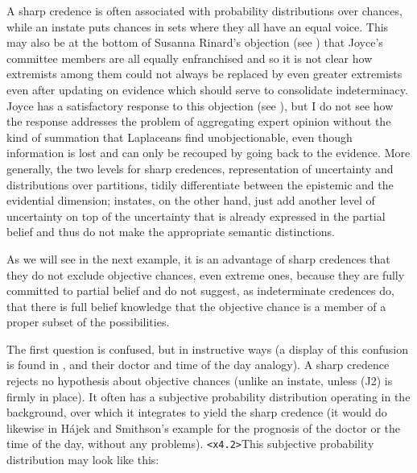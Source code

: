 \documentclass[11pt]{article}
\begin{document}
A sharp credence is often associated with probability distributions
over chances, while an instate puts chances in sets where they all
have an equal voice. This may also be at the bottom of Susanna
Rinard's objection (see ) that Joyce's
committee members are all equally enfranchised and so it is not clear
how extremists among them could not always be replaced by even greater
extremists even after updating on evidence which should serve to
consolidate indeterminacy. Joyce has a satisfactory response to this
objection (see ), but I do not see how the
response addresses the problem of aggregating expert opinion without
the kind of summation that Laplaceans find unobjectionable, even
though information is lost and can only be recouped by going back to
the evidence. More generally, the two levels for sharp credences,
representation of uncertainty and distributions over partitions,
tidily differentiate between the epistemic and the evidential
dimension; instates, on the other hand, just add another level of
uncertainty on top of the uncertainty that is already expressed in the
partial belief and thus do not make the appropriate semantic
distinctions.

As we will see in the next example, it is an advantage of sharp
credences that they do not exclude objective chances, even extreme
ones, because they are fully committed to partial belief and do not
suggest, as indeterminate credences do, that there is full belief
knowledge that the objective chance is a member of a proper subset of
the possibilities.


The first question is confused, but in instructive ways (a display of
this confusion is found in , and their
doctor and time of the day analogy). A sharp credence rejects no
hypothesis about objective chances (unlike an instate, unless (J2) is
firmly in place). It often has a subjective probability distribution
operating in the background, over which it integrates to yield the
sharp credence (it would do likewise in H{\'a}jek and Smithson's
example for the prognosis of the doctor or the time of the day,
without any problems). \texttt{<x4.2>}This subjective probability
distribution may look like this:
\end{document}

